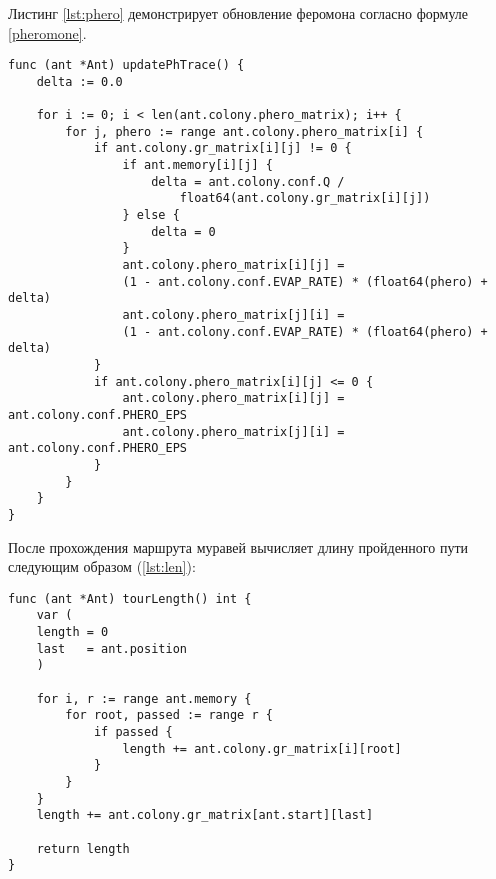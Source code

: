 Листинг \ref{lst:phero} демонстрирует обновление феромона согласно формуле \ref{pheromone}.\newpage
\begin{lstlisting}[label=lst:phero,caption=Обновление феромона]
func (ant *Ant) updatePhTrace() {
	delta := 0.0
	
	for i := 0; i < len(ant.colony.phero_matrix); i++ {
		for j, phero := range ant.colony.phero_matrix[i] {
			if ant.colony.gr_matrix[i][j] != 0 {
				if ant.memory[i][j] {
					delta = ant.colony.conf.Q / 
						float64(ant.colony.gr_matrix[i][j])
				} else {
					delta = 0
				}
				ant.colony.phero_matrix[i][j] = 
				(1 - ant.colony.conf.EVAP_RATE) * (float64(phero) + delta)
				ant.colony.phero_matrix[j][i] = 
				(1 - ant.colony.conf.EVAP_RATE) * (float64(phero) + delta)
			}
			if ant.colony.phero_matrix[i][j] <= 0 {
				ant.colony.phero_matrix[i][j] = ant.colony.conf.PHERO_EPS
				ant.colony.phero_matrix[j][i] = ant.colony.conf.PHERO_EPS
			}
		}
	}
}
\end{lstlisting}
После прохождения маршрута муравей вычисляет длину пройденного пути следующим образом (\ref{lst:len}):
\begin{lstlisting}[label=lst:len,caption=Длина маршрута]
func (ant *Ant) tourLength() int {
	var (
	length = 0
	last   = ant.position
	)
	
	for i, r := range ant.memory {
		for root, passed := range r {
			if passed {
				length += ant.colony.gr_matrix[i][root]
			}
		}
	}
	length += ant.colony.gr_matrix[ant.start][last]
	
	return length
}
\end{lstlisting}
